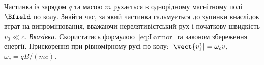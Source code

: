 \begin{problem}
	Частинка із зарядом $q$ та масою $m$ рухається в однорідному магнітному полі $\Bfield$ по колу.
	Знайти час, за який частинка гальмується до зупинки внаслідок втрат на випромінювання, вважаючи нерелятивістський
	рух і початкову швидкість $v_0 \ll c$.
	\emph{Вказівка.} Скористатись формулою~\eqref{eq:Larmor} та законом збереження енергії.
	Прискорення при рівномірному русі по колу: $|\dot{\vect{v}}| = \omega_c v$, $\omega_c = qB/(mc)$.

\end{problem}


